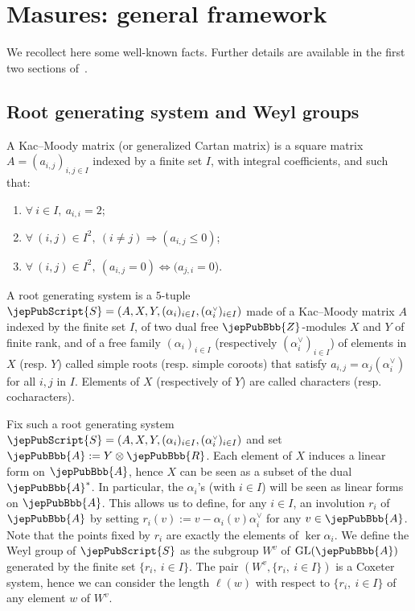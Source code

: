 \section{Masures: general framework}
We recollect here some well-known facts. Further details are available in the first two sections of~\cite{jep88refRou11}.
\subsection{Root generating system and Weyl groups}
A Kac--Moody matrix (or generalized Cartan matrix) is a square matrix $A=(a_{i,j})_{i,j\in I}$ indexed by a finite set $I$, with integral coefficients, and such that:
\begin{enumerate}[label=(\roman*)]
\item $\forall\ i\in I,\ a_{i,i}=2$;
\item $\forall\ (i,j)\in I^2,\ (i\neq j)\Rightarrow(a_{i,j}\leqslant0)$;
\item $\forall\ (i,j)\in I^2,\ (a_{i,j}=0)\Leftrightarrow(a_{j,i}=0$).
\end{enumerate}
A root generating system is a $5$-tuple $\jepPubScript{S}=(A,X,Y,(\alpha_i)_{i\in I},(\alpha_i^{\scriptscriptstyle\vee})_{i\in I})$ made of a Kac--Moody matrix $A$ indexed by the finite set $I$, of two dual free $\jepPubBbb{Z}$-modules $X$ and $Y$ of finite rank, and of a free family $(\alpha_i)_{i\in I}$ (respectively $(\alpha_i^{\scriptscriptstyle\vee})_{i\in I}$) of elements in $X$ (resp. $Y$) called simple roots (resp. simple coroots) that satisfy $a_{i,j}=\alpha_j(\alpha_i^{\scriptscriptstyle\vee})$ for all $i,j$ in $I$. Elements of $X$ (respectively of $Y$) are called characters (resp. cocharacters).

Fix such a root generating system $\jepPubScript{S}=(A,X,Y,(\alpha_i)_{i\in I},(\alpha_i^{\scriptscriptstyle\vee})_{i\in I})$ and set $\jepPubBbb{A}:=Y\otimes\jepPubBbb{R}$. Each element of $X$ induces a linear form on $\jepPubBbb{A}$, hence $X$ can be seen as a subset of the dual $\jepPubBbb{A}^*$. In particular, the $\alpha_i$'s (with $i\in I$) will be seen as linear forms on $\jepPubBbb{A}$. This allows us to define, for any $i\in I$, an involution $r_i$ of $\jepPubBbb{A}$ by setting $r_i(v):=v-\alpha_i(v)\alpha_i^{\scriptscriptstyle\vee}$ for any $v\in\jepPubBbb{A}$. Note that the points fixed by $r_i$ are exactly the elements of $\ker\alpha_i$. We define the Weyl group of $\jepPubScript{S}$ as the subgroup $W^v$ of $\mathrm{GL}(\jepPubBbb{A})$ generated by the finite set $\{r_i,\ i\in I\}$. The pair $(W^v,\{r_i,\ i\in I\})$ is a Coxeter system, hence we can consider the length $\ell(w)$ with respect to $\{r_i,\ i\in I\}$ of any element $w$ of $W^v$.


